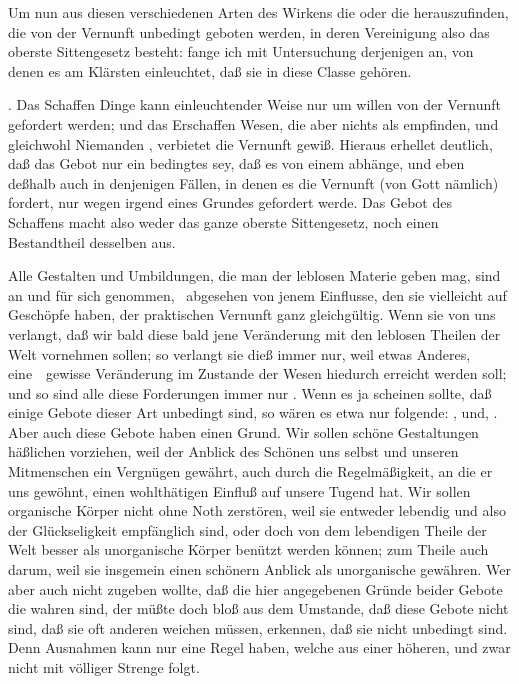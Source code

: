 \begin{aufza}
\begin{aufzb}
\end{aufzb}
\item Um nun aus diesen verschiedenen Arten des Wirkens die  oder die  herauszufinden, die von der Vernunft unbedingt geboten werden, in deren Vereinigung also das oberste Sittengesetz besteht: fange ich mit Untersuchung derjenigen an, von denen es am Klärsten einleuchtet, daß sie in diese Classe  gehören.
\begin{aufzb}
\item {}. Das Schaffen  Dinge kann einleuchtender Weise nur um  willen von der Vernunft gefordert werden; und das Erschaffen  Wesen, die aber nichts als  empfinden, und gleichwohl Niemanden , verbietet die Vernunft gewiß. Hieraus erhellet deutlich, daß das Gebot  nur ein bedingtes sey, daß es von einem  abhänge, und eben deßhalb auch in denjenigen Fällen, in denen es die Vernunft (von Gott nämlich) fordert, nur wegen irgend eines  Grundes gefordert werde. Das Gebot des Schaffens macht also weder das ganze oberste Sittengesetz, noch einen Bestandtheil desselben aus.
\item {} Alle Gestalten und Umbildungen, die man der leblosen Materie geben mag, sind an und für sich genommen, \dh\ abgesehen von jenem Einflusse, den sie vielleicht auf  Geschöpfe haben, der praktischen Vernunft ganz gleichgültig. Wenn sie von uns verlangt, daß wir bald diese bald jene Veränderung mit den leblosen Theilen der Welt vornehmen sollen; so verlangt sie dieß immer nur, weil etwas Anderes, eine~\ gewisse Veränderung im Zustande der  Wesen hiedurch erreicht werden soll; und so sind alle diese Forderungen immer nur . Wenn es ja scheinen sollte, daß einige Gebote dieser Art unbedingt sind, so wären es etwa nur folgende: , und, . Aber auch diese Gebote haben einen Grund. Wir sollen schöne Gestaltungen häßlichen vorziehen, weil der Anblick des Schönen uns selbst und unseren Mitmenschen ein Vergnügen gewährt, auch durch die Regelmäßigkeit, an die er uns gewöhnt, einen wohlthätigen Einfluß auf unsere Tugend hat. Wir sollen organische Körper nicht ohne Noth zerstören, weil sie entweder lebendig und also der Glückseligkeit empfänglich sind, oder doch von dem lebendigen Theile der Welt besser als unorganische Körper benützt werden können; zum Theile auch darum, weil sie insgemein einen schönern Anblick als unorganische gewähren. Wer aber auch nicht zugeben wollte, daß die hier angegebenen Gründe beider Gebote die wahren sind, der müßte doch bloß aus dem Umstande, daß diese Gebote nicht  sind, daß sie oft anderen weichen müssen, erkennen, daß sie nicht unbedingt sind. Denn Ausnahmen kann nur eine Regel haben, welche aus einer höheren, und zwar nicht mit völliger Strenge folgt.

\end{aufzb}
\end{aufza}
